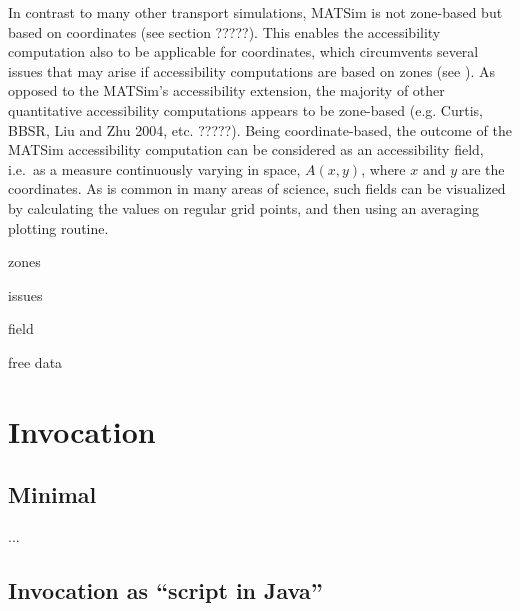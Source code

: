 





In contrast to many other transport simulations, MATSim is not zone-based but based on coordinates (see section ?????). This enables the accessibility computation also to be applicable for coordinates, which circumvents several issues that may arise if accessibility computations are based on zones (see \citep[e.g.][]{NicolaiNagel2012HiResAccessibilityMethodInBook}). As opposed to the MATSim's accessibility extension, the majority of other quantitative accessibility computations appears to be zone-based (e.g. Curtis, BBSR, Liu and Zhu 2004, etc. ?????). Being coordinate-based, the outcome of the MATSim accessibility computation can be considered as an accessibility field,
i.e.\ as a measure continuously varying in space, $A(x,y)$, where $x$ and $y$
are the coordinates.  As is common in many areas of science, such
fields can be visualized by calculating the values on regular grid
points, and then using an averaging plotting routine.  

zones

issues

field

free data






\section{Invocation}

\subsection{Minimal}

...



\subsection{Invocation as ``script in Java''}

